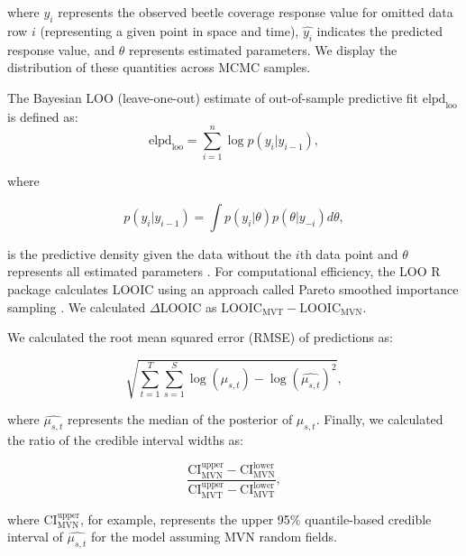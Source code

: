 \documentclass[12pt,english]{article}
\begin{document}
\begin{spacing}{1.4}
\noindent where $y_{i}$ represents the observed beetle coverage response value
for omitted data row $i$ (representing a given point in space and time),
$\widehat{y_{i}}$ indicates the predicted response value, and $\theta$
represents estimated parameters. We display the distribution of these quantities
across MCMC samples.

The Bayesian LOO (leave-one-out) estimate of out-of-sample
predictive fit $\mathrm{elpd}_\mathrm{loo}$ is defined as:
\begin{equation}
  \mathrm{elpd}_\mathrm{loo} = \sum^{n}_{i=1}{\log  p(y_i | y_{i-1}) },
\end{equation}

\noindent where

\begin{equation}
  p(y_i | y_{i-1}) = \int p(y_i | \theta) p (\theta | y_{-i}) d \theta ,
\end{equation}

\noindent is the predictive density given the data without the $i$th data point
and $\theta$ represents all estimated parameters
\citep{vehtari2017}. For computational efficiency, the LOO R package calculates
LOOIC using an approach called Pareto smoothed importance sampling
\citep{vehtari2017}. We calculated $\Delta$LOOIC as
$\mathrm{LOOIC}_\mathrm{MVT} - \mathrm{LOOIC}_\mathrm{MVN}$.

We calculated the root mean squared error (RMSE) of predictions as:

\begin{equation}
  \sqrt{ \sum^{T}_{t=1}{ \sum^{S}_{s=1}{ \log(\mu_{s,t}) - \log(\widehat{ \mu_{s,t} })^2 } } },
\end{equation}

\noindent where $\widehat{\mu_{s,t}}$ represents the median of the posterior of
$\mu_{s,t}$. Finally, we calculated the ratio of the credible interval
widths as:

\begin{equation}
\frac{
\mathrm{CI}_\mathrm{MVN}^\mathrm{upper} - \mathrm{CI}_\mathrm{MVN}^\mathrm{lower}
}{
\mathrm{CI}_\mathrm{MVT}^\mathrm{upper} -
\mathrm{CI}_\mathrm{MVT}^\mathrm{lower}
},
\end{equation}

\noindent where $\mathrm{CI}_\mathrm{MVN}^\mathrm{upper}$, for example,
represents the upper 95\% quantile-based credible interval of
$\widehat{\mu_{s,t}}$ for the model assuming MVN random fields.

\clearpage

\end{spacing}
\end{document}
